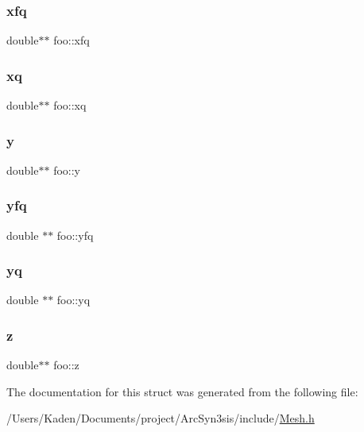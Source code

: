 \mbox{\label{a00758_ab0b1aba5302da3a36486b7cd045eec04}} 
\subsubsection{\texorpdfstring{xfq}{xfq}}
{\footnotesize\ttfamily double$\ast$$\ast$ foo\+::xfq}

\mbox{\label{a00758_af8a12a22497cc7d6fbf6a6ae9b8b8f17}} 
\subsubsection{\texorpdfstring{xq}{xq}}
{\footnotesize\ttfamily double$\ast$$\ast$ foo\+::xq}

\mbox{\label{a00758_a69cf454b93c47aeaa89893c2bdf843af}} 
\subsubsection{\texorpdfstring{y}{y}}
{\footnotesize\ttfamily double$\ast$$\ast$ foo\+::y}

\mbox{\label{a00758_a97add37b674ff45f064f27235667dc7a}} 
\subsubsection{\texorpdfstring{yfq}{yfq}}
{\footnotesize\ttfamily double $\ast$$\ast$ foo\+::yfq}

\mbox{\label{a00758_aa6ae1b8d3eae8c0c3326c02cae2fdafe}} 
\subsubsection{\texorpdfstring{yq}{yq}}
{\footnotesize\ttfamily double $\ast$$\ast$ foo\+::yq}

\mbox{\label{a00758_a07a5b33f3b6f1b2bd8db834cf5472fdd}} 
\subsubsection{\texorpdfstring{z}{z}}
{\footnotesize\ttfamily double$\ast$$\ast$ foo\+::z}



The documentation for this struct was generated from the following file\+:\begin{DoxyCompactItemize}
\item 
/\+Users/\+Kaden/\+Documents/project/\+Arc\+Syn3sis/include/\hyperlink{a00557}{Mesh.\+h}\end{DoxyCompactItemize}
